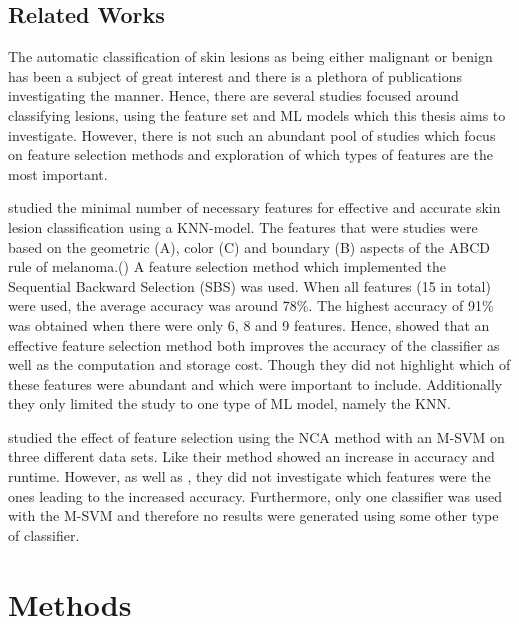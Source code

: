 \documentclass{kththesis}
\begin{document}
\section{Related Works}


The automatic classification of skin lesions as being either malignant or benign has been a subject of great interest and there is a plethora of publications investigating the manner. Hence, there are several studies focused around classifying lesions, using the feature set and ML models which this thesis aims to investigate. However, there is not such an abundant pool of studies which focus on feature selection methods and exploration of which types of features are the most important. 

\parencite{MustafaSuleiman2017Fsus} studied the minimal number of necessary features for effective and accurate skin lesion classification using a KNN-model.  The features that were studies were based on the geometric (A), color (C)  and boundary (B) aspects of the ABCD rule of melanoma.(\parencite{MustafaSuleiman2017Fsus}) A feature selection method which implemented the Sequential Backward Selection (SBS) was used. When all features (15 in total) were used, the average accuracy was around 78\%. The highest accuracy of 91\% was obtained when there were only 6, 8 and 9 features. Hence, \parencite{MustafaSuleiman2017Fsus} showed that an effective feature selection method both improves the accuracy of the classifier as well as the computation and storage cost. Though they did not highlight which of these features were abundant and which were important to include. Additionally they only limited the study to one type of ML model, namely the KNN. 

\parencite{MustafaSuleiman2017Fsus} studied the effect of feature selection using the NCA method with an M-SVM on three different data sets. Like \parencite{MustafaSuleiman2017Fsus} their method showed an increase in accuracy and runtime. However, as well as \parencite{MustafaSuleiman2017Fsus}, they did not investigate which features were the ones leading to the increased accuracy. Furthermore, only one classifier was used with the M-SVM and therefore no results were generated using some other type of classifier. 


\chapter{Methods}
\end{document}
